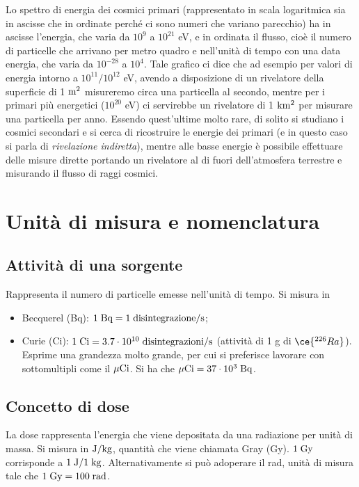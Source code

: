 \vspace{0.4cm}Lo spettro di energia dei cosmici primari (rappresentato in scala logaritmica sia in ascisse che in ordinate perché ci sono numeri che variano parecchio) ha in ascisse l'energia, che varia da $10^9$ a $10^{21}$ eV, e in ordinata il flusso, cioè il numero di particelle che arrivano per metro quadro e nell'unità di tempo con una data energia, che varia da $10^{-28}$ a $10^4$. Tale grafico ci dice che ad esempio per valori di energia intorno a $10^{11}/10^{12}$ eV, avendo a disposizione di un rivelatore della superficie di 1 $\rm m^2$ misureremo circa una particella al secondo, mentre per i primari più energetici ($10^{20}$ eV) ci servirebbe un rivelatore di 1 $\rm km^2$ per misurare una particella per anno. Essendo quest'ultime molto rare, di solito si studiano i cosmici secondari e si cerca di ricostruire le energie dei primari (e in questo caso si parla di \textit{rivelazione indiretta}), mentre alle basse energie è possibile effettuare delle misure dirette portando un rivelatore al di fuori dell'atmosfera terrestre e misurando il flusso di raggi cosmici.

\section{Unità di misura e nomenclatura}

\subsection{Attività di una sorgente}

Rappresenta il numero di particelle emesse nell'unità di tempo. Si misura in

\begin{itemize}
    \item Becquerel (Bq): $\rm 1 \; Bq=1 \; disintegrazione/s$;
    \item Curie (Ci): $\rm 1 \; Ci=3.7 \cdot 10^{10} \; disintegrazioni/s$ (attività di 1 g di $\ce{^{226}Ra}$). Esprime una grandezza molto grande, per cui si preferisce lavorare con sottomultipli come il $\rm \mu Ci$. Si ha che $\rm \mu Ci=37 \cdot 10^3 \; Bq$.
\end{itemize}

\subsection{Concetto di dose}
La dose rappresenta l'energia che viene depositata da una radiazione per unità di massa. Si misura in $\rm J/kg$, quantità che viene chiamata Gray (Gy). $\rm 1 \; Gy$ corrisponde a $\rm 1 \; J/1 \; kg$. Alternativamente si può adoperare il rad, unità di misura tale che $\rm 1 \; Gy=100 \; rad$.

